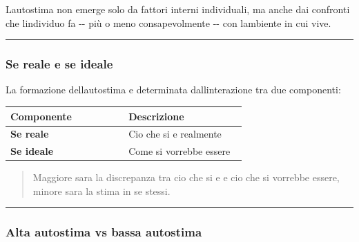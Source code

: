 \documentclass[a4paper,11pt]{article}
\begin{document}
L\textquotesingle autostima non emerge solo da fattori interni
individuali, ma anche dai confronti che l\textquotesingle individuo fa
-\/- più o meno consapevolmente -\/- con l\textquotesingle ambiente in
cui vive.


\begin{center}\rule{0.5\linewidth}{0.5pt}\end{center}

\subsubsection{Se reale e se ideale}\label{se-reale-e-se-ideale}

La formazione dell\textquotesingle autostima e determinata
dall\textquotesingle interazione tra due componenti:

\begin{longtable}[]{@{}p{0.47\linewidth}p{0.47\linewidth}@{}}
      \toprule\noalign{}
      Componente         & Descrizione             \\
      \midrule\noalign{}
      \endhead
      \bottomrule\noalign{}
      \endlastfoot
      \textbf{Se reale}  & Cio che si e realmente  \\
      \textbf{Se ideale} & Come si vorrebbe essere \\
\end{longtable}

\begin{quote}
      Maggiore sara la discrepanza tra cio che si e e cio che si vorrebbe
      essere, minore sara la stima in se stessi.
\end{quote}

\begin{center}\rule{0.5\linewidth}{0.5pt}\end{center}

\subsubsection{Alta autostima vs bassa
      autostima}\label{alta-autostima-vs-bassa-autostima}
\end{document}

